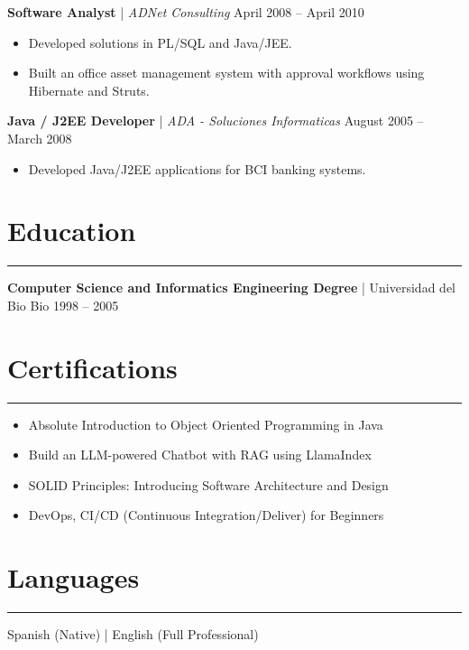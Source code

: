 \documentclass[11pt,a4paper]{article}
\begin{document}
\vspace{8pt}

\textbf{Software Analyst} | \textit{ADNet Consulting} \hfill April 2008 -- April 2010 \\
\begin{itemize}[noitemsep, topsep=0pt]
    \item Developed solutions in PL/SQL and Java/JEE.
    \item Built an office asset management system with approval workflows using Hibernate and Struts.
\end{itemize}

\vspace{8pt}

\textbf{Java / J2EE Developer} | \textit{ADA - Soluciones Informaticas} \hfill August 2005 -- March 2008 \\
\begin{itemize}[noitemsep, topsep=0pt]
    \item Developed Java/J2EE applications for BCI banking systems.
\end{itemize}

\section*{Education}
\hrule
\vspace{5pt}
\textbf{Computer Science and Informatics Engineering Degree} | Universidad del Bio Bio \hfill 1998 -- 2005

\section*{Certifications}
\hrule
\vspace{5pt}
\begin{itemize}[noitemsep, topsep=0pt]
    \item Absolute Introduction to Object Oriented Programming in Java
    \item Build an LLM-powered Chatbot with RAG using LlamaIndex
    \item SOLID Principles: Introducing Software Architecture and Design
    \item DevOps, CI/CD (Continuous Integration/Deliver) for Beginners
\end{itemize}

\section*{Languages}
\hrule
\vspace{5pt}
Spanish (Native) | English (Full Professional)
\end{document}
